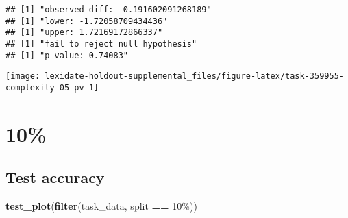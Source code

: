\documentclass[
]{book}
\newenvironment{Shaded}{\begin{snugshade}}{\end{snugshade}}
\newcommand{\AttributeTok}[1]{\textcolor[rgb]{0.13,0.29,0.53}{#1}}
\newcommand{\DecValTok}[1]{\textcolor[rgb]{0.00,0.00,0.81}{#1}}
\newcommand{\FunctionTok}[1]{\textcolor[rgb]{0.13,0.29,0.53}{\textbf{#1}}}
\newcommand{\NormalTok}[1]{#1}
\newcommand{\OtherTok}[1]{\textcolor[rgb]{0.56,0.35,0.01}{#1}}
\newcommand{\SpecialCharTok}[1]{\textcolor[rgb]{0.81,0.36,0.00}{\textbf{#1}}}
\newcommand{\StringTok}[1]{\textcolor[rgb]{0.31,0.60,0.02}{#1}}
\begin{document}
\begin{Shaded}
\end{Shaded}

\begin{verbatim}
## [1] "observed_diff: -0.191602091268189"
## [1] "lower: -1.72058709434436"
## [1] "upper: 1.72169172866337"
## [1] "fail to reject null hypothesis"
## [1] "p-value: 0.74083"
\end{verbatim}

\texttt{[image: lexidate-holdout-supplemental\_files/figure-latex/task-359955-complexity-05-pv-1]}

\hypertarget{section-11}{%
\section{10\%}\label{section-11}}

\hypertarget{test-accuracy-11}{%
\subsection{Test accuracy}\label{test-accuracy-11}}

\begin{Shaded}
\begin{Highlighting}[]
\FunctionTok{test\_plot}\NormalTok{(}\FunctionTok{filter}\NormalTok{(task\_data, split }\SpecialCharTok{==} \StringTok{\textquotesingle{}10\%\textquotesingle{}}\NormalTok{))}
\end{Highlighting}
\end{Shaded}
\end{document}
